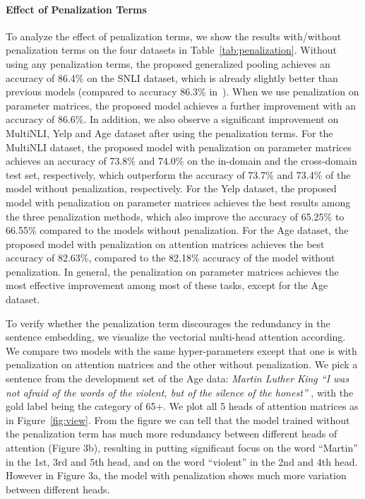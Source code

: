 \documentclass[11pt]{article}
\begin{document}
\paragraph{Effect of Penalization Terms}
To analyze the effect of penalization terms, we show the results with/without penalization terms on the four datasets in Table~\ref{tab:penalization}. Without using any penalization terms, the proposed generalized pooling achieves an accuracy of 86.4\% on the SNLI dataset, which is already slightly better than previous models (compared to accuracy 86.3\% in~). When we use penalization on parameter matrices, the proposed model achieves a further improvement with an accuracy of 86.6\%. In addition, we also observe a significant improvement on MultiNLI, Yelp and Age dataset after using the penalization terms. For the MultiNLI dataset, the proposed model with penalization on parameter matrices achieves an accuracy of 73.8\% and 74.0\% on the in-domain and the cross-domain test set, respectively, which outperform the accuracy of 73.7\% and 73.4\% of the model without penalization, respectively. For the Yelp dataset, the proposed model with penalization on parameter matrices achieves the best results among the three penalization methods, which also improve the accuracy of 65.25\% to 66.55\% compared to the models without penalization. For the Age dataset, the proposed model with penalization on attention matrices achieves the best accuracy of 82.63\%, compared to the 82.18\% accuracy of the model without penalization. In general, the penalization on parameter matrices achieves the most effective improvement among most of these tasks, except for the Age dataset.

To verify whether the penalization term  discourages the redundancy in the sentence embedding, we visualize the vectorial multi-head attention according. We compare two models with the same hyper-parameters except that one is with penalization on attention matrices and the other without penalization. We pick a sentence from the development set of the Age data: \textit{Martin Luther King ``I was not afraid of the words of the violent, but of the silence of the honest'' }, with the gold label being the category of 65+. We plot all 5 heads of attention matrices as in Figure~\ref{fig:view}. From the figure we can tell that the model trained without the penalization term has much more redundancy between different heads of attention (Figure 3b), resulting in putting significant focus on the word ``Martin'' in the 1st, 3rd and 5th head, and on the word ``violent'' in the 2nd and 4th head. However in Figure 3a, the model with penalization shows much more variation between different heads.  
\end{document}
